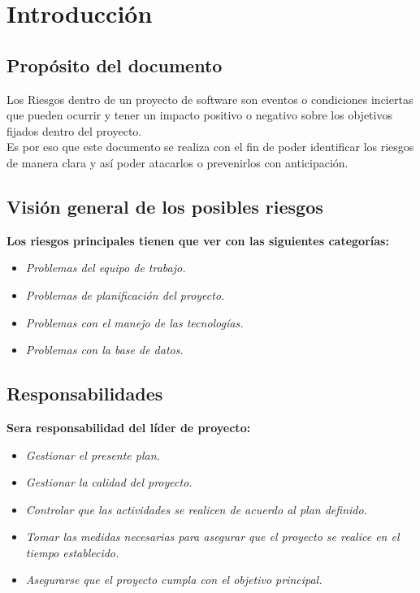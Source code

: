 \documentclass[12pt,a4paper]{article}
\begin{document}


\section{Introducción}
\vspace{1 cm}
\subsection{Propósito del documento}
Los Riesgos dentro de un proyecto de software son eventos o condiciones inciertas que pueden ocurrir y tener un impacto positivo o negativo sobre los objetivos fijados dentro del proyecto.\\
Es por eso que este documento se realiza con el fin de poder identificar los riesgos de manera clara y así poder atacarlos o prevenirlos con anticipación.\\
\subsection{Visión general de los posibles riesgos}
\textbf {Los riesgos principales tienen que ver con las siguientes categorías:} \\
\begin{itemize}
\item \textit{Problemas del equipo de trabajo.}
\item \textit{Problemas de planificación del proyecto.}
\item \textit{Problemas con el manejo de las tecnologías.}
\item \textit{Problemas con la base de datos.}
\end{itemize}

\subsection{Responsabilidades}
\textbf {Sera responsabilidad del líder de proyecto:} \\
\begin{itemize}
\item \textit{Gestionar el presente plan.}
\item \textit{Gestionar la calidad del proyecto.}
\item \textit{Controlar que las actividades se realicen de acuerdo al plan definido.}
\item \textit{Tomar las medidas necesarias para asegurar que el proyecto se realice en el tiempo establecido.}
\item \textit{Asegurarse que el proyecto cumpla con el objetivo principal.}
\end{itemize}
\vspace{1 cm}
\end{document}

